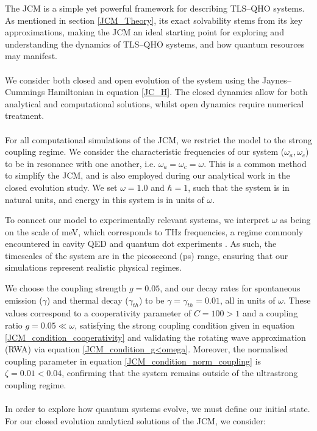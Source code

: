 \documentclass[12pt]{article}
\begin{document}
The JCM is a simple yet powerful framework for describing TLS--QHO systems. As mentioned in section \ref{JCM_Theory}, its exact solvability stems from its key approximations, making the JCM an ideal starting point for exploring and understanding the dynamics of TLS--QHO systems, and how quantum resources may manifest.\\
\\
We consider both closed and open evolution of the system using the Jaynes--Cummings Hamiltonian in equation \eqref{JC_H}. The closed dynamics allow for both analytical and computational solutions, whilst open dynamics require numerical treatment.\\
\\
For all computational simulations of the JCM, we restrict the model to the strong coupling regime. We consider the characteristic frequencies of our system ($\omega_a, \omega_c$) to be in resonance with one another, i.e. $\omega_a = \omega_c = \omega$. This is a common method to simplify the JCM, and is also employed during our analytical work in the closed evolution study. We set $\omega = 1.0$ and $\hbar = 1$, such that the system is in natural units, and energy in this system is in units of $\omega$. 

To connect our model to experimentally relevant systems, we interpret $\omega$ as being on the scale of meV, which corresponds to THz frequencies, a regime commonly encountered in cavity QED and quantum dot experiments \cite{General2024-JCM_relevance}. As such, the timescales of the system are in the picosecond (ps) range, ensuring that our simulations represent realistic physical regimes.

We choose the coupling strength $g = 0.05$, and our decay rates for spontaneous emission ($\gamma$) and thermal decay ($\gamma_{\scriptscriptstyle th}$) to be $\gamma = \gamma_{\scriptscriptstyle th} = 0.01$, all in units of $\omega$. These values correspond to a cooperativity parameter of $C = 100 > 1$ and a coupling ratio $g = 0.05 \ll \omega$, satisfying the strong coupling condition given in equation \eqref{JCM_condition_cooperativity} and validating the rotating wave approximation (RWA) via equation \eqref{JCM_condition_g<omega}. Moreover, the normalised coupling parameter in equation \eqref{JCM_condition_norm_coupling} is $\zeta = 0.01 < 0.04$, confirming that the system remains outside of the ultrastrong coupling regime.\\
\\
In order to explore how quantum systems evolve, we must define our initial state. For our closed evolution analytical solutions of the JCM, we consider:
\end{document}
